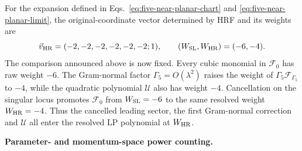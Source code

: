 \documentclass[a4paper,11pt]{article}
\newcommand{\WSL}{W_{\rm SL}}
\newcommand{\WHR}{W_{\rm HR}}
\newcommand{\vHR}{\vec v_{\rm HR}}
\begin{document}
For the expansion defined in Eqs.~\eqref{eq:five-near-planar-chart} and
\eqref{eq:five-near-planar-limit}, the original-coordinate vector determined
by HRF and its weights are
\begin{equation}
 \vHR=(-2,-2,-2,-2,-2,-2;1),
 \qquad (\WSL,\WHR)=(-6,-4).
 \label{eq:five-near-planar-vector}
\end{equation}
The comparison announced above is now fixed.  Every cubic monomial in
\(\mathcal F_0\) has raw weight \(-6\).  The Gram-normal factor
\(\Gamma_5=O(\lambda^2)\) raises the weight of
\(\Gamma_5\mathcal F_{\Gamma_5}\) to \(-4\), while the quadratic polynomial
\(\mathcal U\) also has weight \(-4\).  Cancellation on the singular locus
promotes \(\mathcal F_0\) from \(\WSL=-6\) to the same resolved weight
\(\WHR=-4\).  Thus the cancelled leading sector, the first Gram-normal
correction and \(\mathcal U\) all enter the resolved LP polynomial at
\(\WHR\).

\medskip
\noindent\textbf{Parameter- and momentum-space power counting.}\par\smallskip
\end{document}
